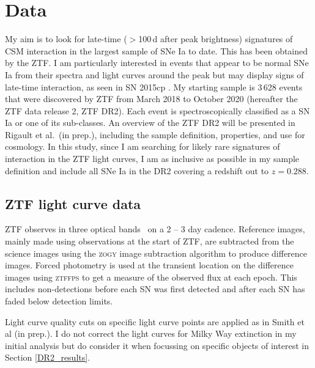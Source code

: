 \documentclass[a4paper,oneside,12pt, class=Latex/Classes/PhDthesisPSnPDF, crop=false]{standalone}
\begin{document}
\section{Data}
\label{DR2_data}
My aim is to look for late-time ($>$100\,d after peak brightness) signatures of CSM interaction in the largest sample of SNe Ia to date. This has been obtained by the ZTF. I am particularly interested in events that appear to be normal SNe Ia from their spectra and light curves around the peak but may display signs of late-time interaction, as seen in SN 2015cp \citep{2015cp}. My starting sample is 3\,628 events that were discovered by ZTF from March 2018 to October 2020 (hereafter the ZTF data release 2, ZTF DR2). Each event is spectroscopically classified as a SN Ia or one of its sub-classes. An overview of the ZTF DR2 will be presented in Rigault et al.~(in prep.), including the sample definition, properties, and use for cosmology. In this study, since I am searching for likely rare signatures of interaction in the ZTF light curves, I am as inclusive as possible in my sample definition and include all SNe Ia in the DR2 covering a redshift out to $z = 0.288$. 

\subsection{ZTF light curve data}
\label{lc_data}
ZTF observes in three optical bands \ztfg\ztfr\ztfi\ on a 2 -- 3 day cadence. Reference images, mainly made using observations at the start of ZTF, are subtracted from the science images using the \textsc{zogy} image subtraction algorithm \citep{ZOGY} to produce difference images. Forced photometry is used at the transient location on the difference images using \textsc{ztffps} \citep{ztffps} to get a measure of the observed flux at each epoch. This includes non-detections before each SN was first detected and after each SN has faded below detection limits.

 Light curve quality cuts on specific light curve points are applied as in Smith et al (in prep.). I do not correct the light curves for Milky Way extinction in my initial analysis but do consider it when focussing on specific objects of interest in Section \ref{DR2_results}. 
\end{document}
